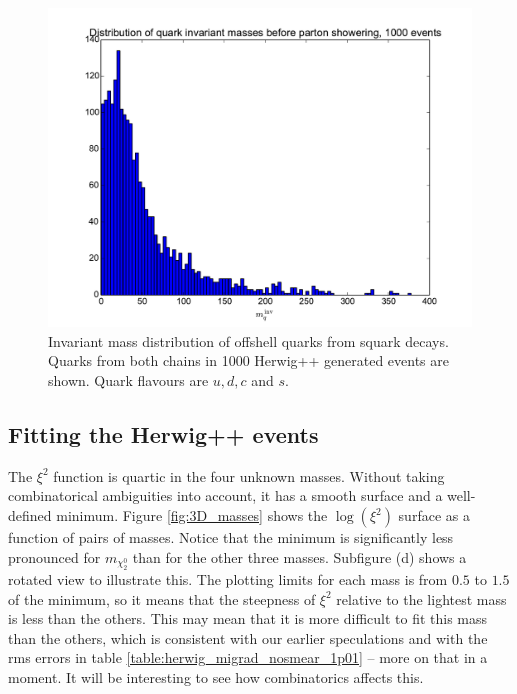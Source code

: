 \documentclass[twoside,english]{uiofysmaster}
\begin{document}
\begin{figure}[hbt]
\centering
\includegraphics[scale=0.7]{figures/quark_invmass_before_showering_both_chains_combined_N1000.pdf} 
\caption{Invariant mass distribution of offshell quarks from squark decays. Quarks from both chains in 1000 {\ttfamily Herwig++} generated events are shown. Quark flavours are $u,d,c$ and $s$.}
\label{fig:invmass_offshellquarks}
\end{figure}

\subsection{Fitting the {\ttfamily Herwig++} events}
The $\xi^2$ function is quartic in the four unknown masses. Without taking combinatorical ambiguities into account, it has a smooth surface and a well-defined minimum. Figure \ref{fig:3D_masses} shows the $\log(\xi^2)$ surface as a function of pairs of masses. Notice that the minimum is significantly less pronounced for $m_{\chi_2^0}$ than for the other three masses. Subfigure (d) shows a rotated view to illustrate this. The plotting limits for each mass is from $0.5$ to $1.5$ of the minimum, so it means that the steepness of $\xi^2$ relative to the lightest mass is less than the others. This may mean that it is more difficult to fit this mass than the others, which is consistent with our earlier speculations and with the rms errors in table \ref{table:herwig_migrad_nosmear_1p01} -- more on that in a moment. It will be interesting to see how combinatorics affects this. 
\end{document}
